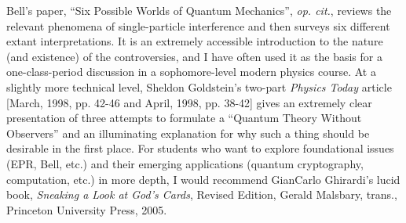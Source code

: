 \documentclass[aps,prc,twocolumn,letterpaper,floatfix]{revtex4}
\begin{document}
\begin{thebibliography}{99}
  Bell's paper, ``Six Possible Worlds of Quantum
  Mechanics'', \emph{op. cit.}, reviews the relevant phenomena of
  single-particle interference and then surveys six different extant
  interpretations.  It is an extremely accessible introduction to the
  nature (and existence) of the controversies, and I have often used
  it as the basis for a one-class-period discussion in a
  sophomore-level modern physics course.  At a slightly more technical
  level, Sheldon Goldstein's two-part \emph{Physics Today} article
  [March, 1998, pp. 42-46 and April, 1998, pp. 38-42] gives an
  extremely clear presentation of three attempts to formulate a
  ``Quantum Theory Without Observers'' and an illuminating explanation
  for why such a thing should be desirable in the first place.  For
  students who want to explore foundational issues (EPR, Bell, etc.)
  and their emerging applications (quantum cryptography, computation,
  etc.) in more depth, I would recommend GianCarlo Ghirardi's lucid
  book, \emph{Sneaking a Look at God's Cards}, Revised Edition, Gerald
  Malsbary, trans., Princeton University Press, 2005.  

\end{thebibliography}
\end{document}

